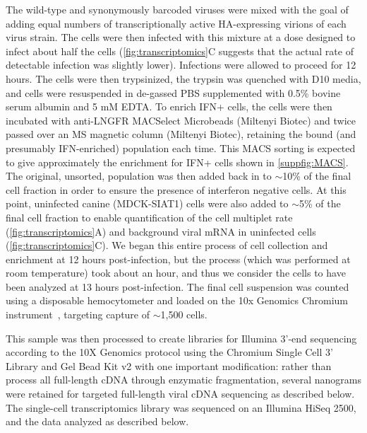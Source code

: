 \documentclass[10pt,letterpaper]{article}
\newcommand{\FIG}[1]{\autoref{fig:#1}}
\newcommand{\SUPPFIG}[1]{\autoref{suppfig:#1}}
\begin{document}
The wild-type and synonymously barcoded viruses were mixed with the goal of adding equal numbers of transcriptionally active HA-expressing virions of each virus strain.
The cells were then infected with this mixture at a dose designed to infect about half the cells (\FIG{transcriptomics}C suggests that the actual rate of detectable infection was slightly lower).
Infections were allowed to proceed for 12 hours.
The cells were then trypsinized, the trypsin was quenched with D10 media, and cells were resuspended in de-gassed PBS supplemented with 0.5\% bovine serum albumin and 5 mM EDTA. 
To enrich IFN+ cells, the cells were then incubated with anti-LNGFR MACSelect Microbeads (Miltenyi Biotec) and twice passed over an MS magnetic column (Miltenyi Biotec), retaining the bound (and presumably IFN-enriched) population each time. 
This MACS sorting is expected to give approximately the enrichment for IFN+ cells shown in \SUPPFIG{MACS}.
The original, unsorted, population was then added back in to $\sim$10\% of the final cell fraction in order to ensure the presence of interferon negative cells. 
At this point, uninfected canine (MDCK-SIAT1) cells were also added to $\sim$5\% of the final cell fraction to enable quantification of the cell multiplet rate (\FIG{transcriptomics}A) and background viral mRNA in uninfected cells (\FIG{transcriptomics}C). 
We began this entire process of cell collection and enrichment at 12 hours post-infection, but the process (which was performed at room temperature) took about an hour, and thus we consider the cells to have been analyzed at 13 hours post-infection.
The final cell suspension was counted using a disposable hemocytometer and loaded on the 10x Genomics Chromium instrument~\citep{zheng2017massively}, targeting capture of $\sim$1,500 cells. 

This sample was then processed to create libraries for Illumina 3'-end sequencing according to the 10X Genomics protocol using the Chromium Single Cell 3' Library and Gel Bead Kit v2 with one important modification: rather than process all full-length cDNA through enzymatic fragmentation, several nanograms were retained for targeted full-length viral cDNA sequencing as described below.
The single-cell transcriptomics library was sequenced on an Illumina HiSeq 2500, and the data analyzed as described below.
\end{document}
